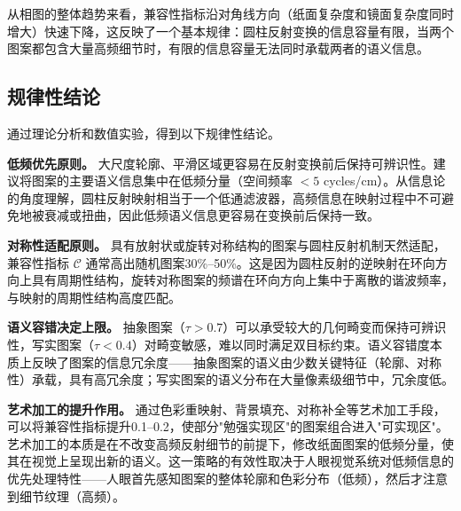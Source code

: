 从相图的整体趋势来看，兼容性指标沿对角线方向（纸面复杂度和镜面复杂度同时增大）快速下降，这反映了一个基本规律：圆柱反射变换的信息容量有限，当两个图案都包含大量高频细节时，有限的信息容量无法同时承载两者的语义信息。

\subsection{规律性结论}

通过理论分析和数值实验，得到以下规律性结论。

\textbf{低频优先原则。} 大尺度轮廓、平滑区域更容易在反射变换前后保持可辨识性。建议将图案的主要语义信息集中在低频分量（空间频率 $< 5$ cycles/cm）。从信息论的角度理解，圆柱反射映射相当于一个低通滤波器，高频信息在映射过程中不可避免地被衰减或扭曲，因此低频语义信息更容易在变换前后保持一致。

\textbf{对称性适配原则。} 具有放射状或旋转对称结构的图案与圆柱反射机制天然适配，兼容性指标 $\mathcal{C}$ 通常高出随机图案30\%--50\%。这是因为圆柱反射的逆映射在环向方向上具有周期性结构，旋转对称图案的频谱在环向方向上集中于离散的谐波频率，与映射的周期性结构高度匹配。

\textbf{语义容错决定上限。} 抽象图案（$\tau > 0.7$）可以承受较大的几何畸变而保持可辨识性，写实图案（$\tau < 0.4$）对畸变敏感，难以同时满足双目标约束。语义容错度本质上反映了图案的信息冗余度——抽象图案的语义由少数关键特征（轮廓、对称性）承载，具有高冗余度；写实图案的语义分布在大量像素级细节中，冗余度低。

\textbf{艺术加工的提升作用。} 通过色彩重映射、背景填充、对称补全等艺术加工手段，可以将兼容性指标提升0.1--0.2，使部分"勉强实现区"的图案组合进入"可实现区"。艺术加工的本质是在不改变高频反射细节的前提下，修改纸面图案的低频分量，使其在视觉上呈现出新的语义。这一策略的有效性取决于人眼视觉系统对低频信息的优先处理特性——人眼首先感知图案的整体轮廓和色彩分布（低频），然后才注意到细节纹理（高频）。
